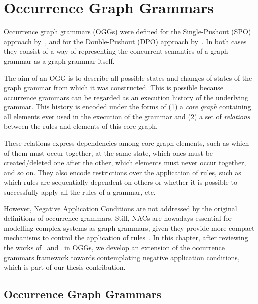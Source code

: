 \chapter{Occurrence Graph Grammars}\label{ch:process}

Occurrence graph grammars (OGGs) were defined for the Single-Pushout (SPO) approach by~\cite{Ribeiro1996}, and for the Double-Pushout (DPO) approach by~\cite{Corradini1996}. In both cases they consist of a way of representing the concurrent semantics of a graph grammar as a graph grammar itself.

The aim of an OGG is to describe all possible states and changes of states of the graph grammar from which it was constructed. This is possible because occurrence grammars can be regarded as an execution history of the underlying grammar. This history is encoded under the forms of (1) a \emph{core graph} containing all elements ever used in the execution of the grammar and (2) a set of \emph{relations} between the rules and elements of this core graph. 

These relations express dependencies among core graph elements, such as which of them must occur together, at the same state, which ones must be created/deleted one after the other, which elements must never occur together, and so on. They also encode restrictions over the application of rules, such as which rules are sequentially dependent on others or whether it is possible to successfully apply all the rules of a grammar, etc. %

However, Negative Application Conditions are not addressed by the original definitions of occurrence grammars. Still, NACs are nowadays essential for modelling complex systems as graph grammars, given they provide more compact mechanisms to control the application of rules~\cite{Habel1996, Lambers2008, Corradini2014}. In this chapter, after reviewing the works of~\cite{Ribeiro1996} and~\cite{Corradini1996} in OGGs, we develop an extension of the occurrence grammars framework towards contemplating negative application conditions, which is part of our thesis contribution.

\section{Occurrence Graph Grammars}

